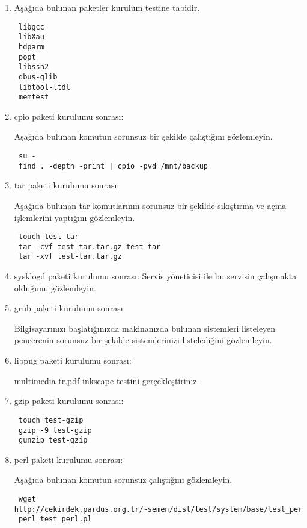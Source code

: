 \documentclass[a4paper,10pt]{article}
\begin{document}
\begin{enumerate}
\item Aşağıda bulunan paketler kurulum testine tabidir.
\begin{verbatim}
 libgcc
 libXau
 hdparm
 popt
 libssh2
 dbus-glib 
 libtool-ltdl 
 memtest 
\end{verbatim}

\item cpio paketi kurulumu sonrası:

Aşağıda bulunan komutun sorunsuz bir şekilde çalıştığını gözlemleyin.
\begin{verbatim}
 su -
 find . -depth -print | cpio -pvd /mnt/backup
\end{verbatim}


\item tar paketi kurulumu sonrası:

Aşağıda bulunan tar komutlarının sorunsuz bir şekilde sıkıştırma ve açma işlemlerini yaptığını gözlemleyin.
\begin{verbatim}
 touch test-tar
 tar -cvf test-tar.tar.gz test-tar 
 tar -xvf test-tar.tar.gz
\end{verbatim}


\item sysklogd paketi kurulumu sonrası:
Servis yöneticisi ile bu servisin çalışmakta olduğunu gözlemleyin.

\item grub paketi kurulumu sonrası:

Bilgisayarınızı başlatığınızda makinanızda bulunan sistemleri listeleyen pencerenin sorunsuz bir şekilde sistemlerinizi listelediğini gözlemleyin. 

\item libpng paketi kurulumu sonrası:

multimedia-tr.pdf inkscape testini gerçekleştiriniz.

\item gzip paketi kurulumu sonrası:
\begin{verbatim}
 touch test-gzip
 gzip -9 test-gzip
 gunzip test-gzip 
\end{verbatim}


\item perl paketi kurulumu sonrası:

Aşağıda bulunan komutun sorunsuz çalıştığını gözlemleyin.
\begin{verbatim}
 wget http://cekirdek.pardus.org.tr/~semen/dist/test/system/base/test_perl.pl
 perl test_perl.pl
\end{verbatim}


\end{enumerate}
\end{document}
